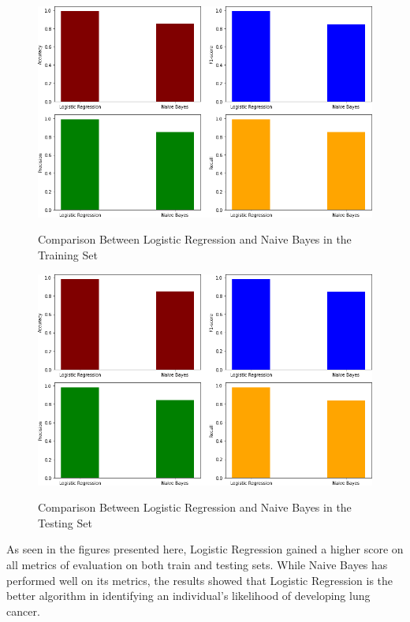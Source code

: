 \documentclass[runningheads]{llncs}
\begin{document}

\begin{figure}[ht]           	 
\centering               	 
\caption{Comparison Between Logistic Regression and Naive Bayes in the Training Set} \vspace{0.5em}
\includegraphics[scale=2.25]{datavis-train.png}  	 
\label{fig:datavis_train}
\end{figure}


\begin{figure}[ht]           	 
\centering          	 
\caption{Comparison Between Logistic Regression and Naive Bayes in the Testing Set} \vspace{0.5em}
\includegraphics[scale=2.25]{datavis-test.png}  	 
\label{fig:datavis_test}
\end{figure}

As seen in the figures presented here, Logistic Regression gained a higher score on all metrics of evaluation on both train and testing sets. While Naive Bayes has performed well on its metrics, the results showed that Logistic Regression is the better algorithm in identifying an individual’s likelihood of developing lung cancer.
\newpage
\end{document}

